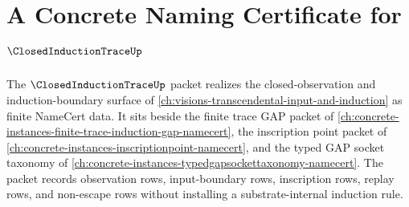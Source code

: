 \chapter{A Concrete Naming Certificate for $\ClosedInductionTraceUp$}
\label{ch:concrete-instances-closed-induction-trace-namecert}

The $\ClosedInductionTraceUp$ packet realizes the closed-observation and induction-boundary surface of \autoref{ch:visions-transcendental-input-and-induction} as finite NameCert data. It sits beside the finite trace GAP packet of \autoref{ch:concrete-instances-finite-trace-induction-gap-namecert}, the inscription point packet of \autoref{ch:concrete-instances-inscriptionpoint-namecert}, and the typed GAP socket taxonomy of \autoref{ch:concrete-instances-typedgapsockettaxonomy-namecert}. The packet records observation rows, input-boundary rows, inscription rows, replay rows, and non-escape rows without installing a substrate-internal induction rule.


